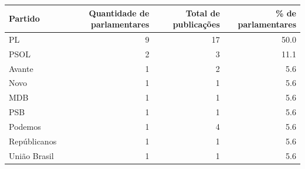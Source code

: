 \begin{tabular}{lrrr}
\toprule
Partido & Quantidade de parlamentares & Total de publicações & \% de parlamentares \\
\midrule
PL & 9 & 17 & 50.0 \\
PSOL & 2 & 3 & 11.1 \\
Avante  & 1 & 2 & 5.6 \\
Novo & 1 & 1 & 5.6 \\
MDB & 1 & 1 & 5.6 \\
PSB  & 1 & 1 & 5.6 \\
Podemos & 1 & 4 & 5.6 \\
Repúblicanos & 1 & 1 & 5.6 \\
União Brasil & 1 & 1 & 5.6 \\
\bottomrule
\end{tabular}
